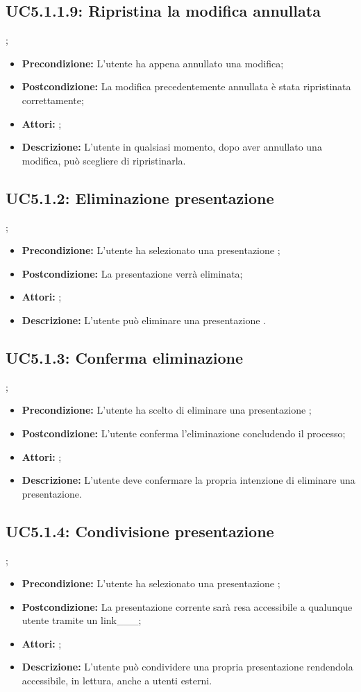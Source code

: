 \subsection{ UC5.1.1.9: Ripristina la modifica annullata}
;
\begin{itemize}
	\item \textbf{Precondizione:} L’utente ha appena annullato una modifica;
	\item \textbf{Postcondizione:} La modifica precedentemente annullata è stata ripristinata correttamente;
	\item \textbf{Attori:} ;
	\item \textbf{Descrizione:} L’utente in qualsiasi momento, dopo aver annullato una modifica, può scegliere di ripristinarla.
\end{itemize}
\subsection{ UC5.1.2: Eliminazione presentazione}
;
\begin{itemize}
	\item \textbf{Precondizione:} L'utente ha selezionato una presentazione ;
	\item \textbf{Postcondizione:} La presentazione verrà eliminata;
	\item \textbf{Attori:} ;
	\item \textbf{Descrizione:} L'utente può eliminare una presentazione .
\end{itemize}
\subsection{ UC5.1.3: Conferma eliminazione }
;
\begin{itemize}
	\item \textbf{Precondizione:} L'utente ha scelto di eliminare una presentazione ;
	\item \textbf{Postcondizione:} L'utente conferma l'eliminazione concludendo il processo;
	\item \textbf{Attori:} ;
	\item \textbf{Descrizione:} L'utente deve confermare la propria intenzione di eliminare una presentazione.
\end{itemize}
\subsection{ UC5.1.4: Condivisione presentazione }
;
\begin{itemize}
	\item \textbf{Precondizione:} L'utente ha selezionato una presentazione ;
	\item \textbf{Postcondizione:} La presentazione corrente sarà resa accessibile a qualunque utente tramite un link___;
	\item \textbf{Attori:} ;
	\item \textbf{Descrizione:} L'utente può condividere una propria presentazione rendendola accessibile, in lettura, anche a utenti esterni.
\end{itemize}
